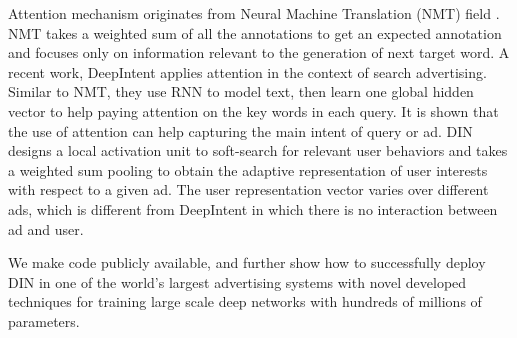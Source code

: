 Attention mechanism originates from Neural Machine Translation (NMT) field \cite{bengio:attention}.
NMT takes a weighted sum of all the annotations to get an expected annotation and focuses only on information relevant to the generation of next target word.
A recent work, DeepIntent \cite{deep_intent} applies attention in the context of search advertising. Similar to NMT, they use RNN\cite{rnn} to model text, then learn one global hidden vector to help paying attention on the key words in each query. It is shown that the use of attention can help capturing the main intent of query or ad.
DIN designs a local activation unit to soft-search for relevant user behaviors and takes a weighted sum pooling to obtain the adaptive representation of user interests with respect to a given ad. The user representation vector varies over different ads, which is different from DeepIntent in which there is no interaction between ad and user.

We make code publicly available, and further show how to successfully deploy DIN in one of the world's largest advertising systems with novel developed techniques for training large scale deep networks with hundreds of millions of parameters. 
